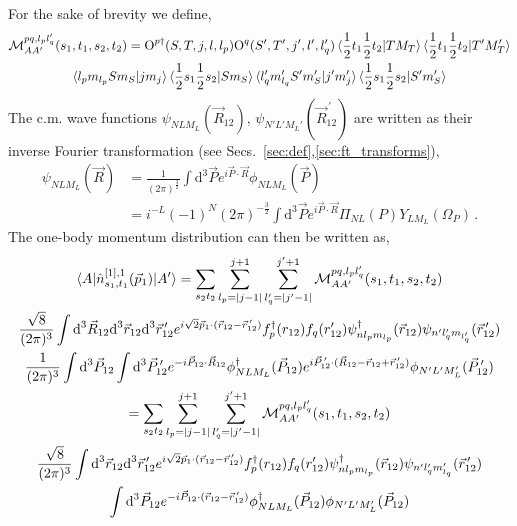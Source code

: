 \documentclass[10pt]{article}
\begin{document}
For the sake of brevity we define,
\begin{multline*}
 \mathcal{M}_{AA'}^{p q,l_p l_q'}(s_1,t_1,s_2,t_2) = \text{O}^{p\dagger}(S,T,j,l,l_p) \text{O}^{q}(S',T',j',l',l_q') \braket{ \frac{1}{2} t_1 \frac{1}{2} t_2 | T M_T } \braket{ \frac{1}{2} t_1 \frac{1}{2} t_2 | T' M_T'} \\
	\braket{ l_p  m_{l_p} S m_S | j m_j } \braket{   \frac{1}{2} s_1 \frac{1}{2} s_2 | S m_S} 
	\braket{ l_q' m_{l_q}' S' m_S' | j' m_j' } \braket{   \frac{1}{2} s_1 \frac{1}{2} s_2 | S' m_S'} \\
\end{multline*}
The c.m. wave functions $\psi_{N L M_L}(\vec{R}_{12})$, $\psi_{N' L' M_L'}(\vec{R}^{\, \prime}_{12})$ are written as their inverse Fourier transformation (see Secs.~\ref{sec:def},\ref{sec:ft_transforms}),
\begin{align}
	\psi_{N L M_L}(\vec{R}) &= \frac{1}{(2 \pi)^{\frac{3}{2}}} \int \text{d}^{3} \vec{P} e^{i \vec{P} \cdot \vec{R}} \phi_{N L M_{L}}(\vec{P}) \\
	&= i^{-L} (-1)^{N} (2 \pi)^{-\frac{3}{2}} \int \text{d}^{3} \vec{P} e^{i \vec{P} \cdot \vec{R}}  \Pi_{N L}(P)  Y_{L M_L}(\Omega_P) \, .
\end{align}
The one-body momentum distribution can then be written as,
\begin{multline*}
	\braket{ A | \hat{n}_{s_1,t_1}^{[1],1}(\vec{p}_1) | A'} = \sum_{s_2 t_2}  \sum_{l_p = |j-1|}^{j+1} \sum_{l_q' = |j' - 1|}^{j'+1} \mathcal{M}_{AA'}^{p q,l_p l_q'}(s_1,t_1,s_2,t_2) \\
   \frac{\sqrt{8}}{(2 \pi)^{3}} \int \text{d}^{3} \vec{R}_{12} \text{d}^{3} \vec{r}_{12} \text{d}^{3} \vec{r}_{12}^{\, \prime}  e^{ i \sqrt{2} \vec{p}_{1} \cdot ( \vec{r}_{12} - \vec{r}_{12}^{\, \prime}) }  f_{p}^{\dagger}(r_{12}) f_{q}(r_{12}') \psi_{ n l_p m_{l_p} }^{\dagger}(\vec{r}_{12}) \psi_{ n' l_q' m_{l_q'} }(\vec{r}_{12}^{\, \prime})  \\
   \frac{1}{(2 \pi)^{3}} \int \text{d}^{3} \vec{P}_{12} \int \text{d}^{3} \vec{P}_{12}^{\, \prime} e^{ -i \vec{P}_{12} \cdot \vec{R}_{12}} \phi_{N L M_L}^{\dagger}(\vec{P}_{12}) e^{ i \vec{P}_{12}^{\, \prime} \cdot ( \vec{R}_{12} - \vec{r}_{12} + \vec{r}_{12}^{\, \prime})} \phi_{N' L' M_L'}(\vec{P}_{12}^{\, \prime}) \\
   = \sum_{s_2 t_2}  \sum_{l_p = |j-1|}^{j+1} \sum_{l_q' = |j' - 1|}^{j'+1} \mathcal{M}_{AA'}^{p q,l_p l_q'}(s_1,t_1,s_2,t_2) \\
    \frac{\sqrt{8}}{(2 \pi)^{3}} \int \text{d}^{3} \vec{r}_{12} \text{d}^{3} \vec{r}_{12}^{\, \prime}  e^{ i \sqrt{2} \vec{p}_{1} \cdot ( \vec{r}_{12} - \vec{r}_{12}^{\, \prime}) } f_{p}^{\dagger}(r_{12}) f_{q}(r_{12}')  \psi_{ n l_p m_{l_p}}^{\dagger}(\vec{r}_{12}) \psi_{ n' l_q' m_{l_q}' }(\vec{r}_{12}^{\, \prime}) \\
   \int \text{d}^{3} \vec{P}_{12} e^{ -i \vec{P}_{12} \cdot (\vec{r}_{12} - \vec{r}_{12}^{\, \prime})} \phi_{N L M_L}^{\dagger}(\vec{P}_{12}) \phi_{N' L' M_L'}(\vec{P}_{12}) 
\end{multline*}
\end{document}
